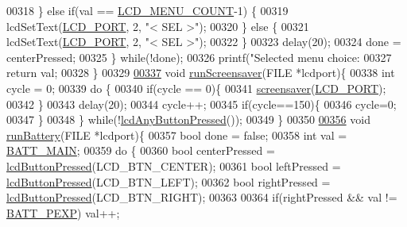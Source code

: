 \begin{DoxyCode}
00318         \} \textcolor{keywordflow}{else} \textcolor{keywordflow}{if}(val == \hyperlink{lcddiag_8h_af08e03edfc50fa6a3af2555f9cce6e6c}{LCD\_MENU\_COUNT}-1) \{
00319             lcdSetText(\hyperlink{lcdmsg_8h_abcf42bd88b3c36193f301ca25b033875}{LCD\_PORT}, 2, \textcolor{stringliteral}{"<      SEL     >"});
00320         \} \textcolor{keywordflow}{else} \{
00321             lcdSetText(\hyperlink{lcdmsg_8h_abcf42bd88b3c36193f301ca25b033875}{LCD\_PORT}, 2, \textcolor{stringliteral}{"<      SEL     >"});
00322         \}
00323         delay(20);
00324         done = centerPressed;
00325     \} \textcolor{keywordflow}{while}(!done);
00326     printf(\textcolor{stringliteral}{"Selected menu choice: %
00327     \textcolor{keywordflow}{return} val;
00328 \}
00329 
\hypertarget{lcddiag_8c_source.tex_l00337}{}\hyperlink{lcddiag_8c_a26920e40538bd7b86a0453f2629991d0}{00337} \textcolor{keywordtype}{void} \hyperlink{lcddiag_8c_a26920e40538bd7b86a0453f2629991d0}{runScreensaver}(FILE *lcdport)\{
00338     \textcolor{keywordtype}{int} cycle = 0;
00339     \textcolor{keywordflow}{do} \{
00340         \textcolor{keywordflow}{if}(cycle == 0)\{
00341             \hyperlink{lcdmsg_8c_acc19fe50b302412c894538965e77cb8b}{screensaver}(\hyperlink{lcdmsg_8h_abcf42bd88b3c36193f301ca25b033875}{LCD\_PORT});
00342         \}
00343         delay(20);
00344         cycle++;
00345         \textcolor{keywordflow}{if}(cycle==150)\{
00346             cycle=0;
00347         \}
00348     \} \textcolor{keywordflow}{while}(!\hyperlink{lcddiag_8h_a0592813f995bfeeadb9bee923833ed35}{lcdAnyButtonPressed}());
00349 \}
00350 
\hypertarget{lcddiag_8c_source.tex_l00356}{}\hyperlink{lcddiag_8c_a9a604d967527579e547780271290500f}{00356} \textcolor{keywordtype}{void} \hyperlink{lcddiag_8c_a9a604d967527579e547780271290500f}{runBattery}(FILE *lcdport)\{
00357     \textcolor{keywordtype}{bool} done = \textcolor{keyword}{false};
00358     \textcolor{keywordtype}{int} val = \hyperlink{sensors_8h_aa48831e4de90908c1b37560e7aba2c5f}{BATT\_MAIN};
00359     \textcolor{keywordflow}{do} \{
00360         \textcolor{keywordtype}{bool} centerPressed = \hyperlink{lcddiag_8h_a74e4c744db49f9b7b645095575e152ad}{lcdButtonPressed}(LCD\_BTN\_CENTER);
00361         \textcolor{keywordtype}{bool} leftPressed = \hyperlink{lcddiag_8h_a74e4c744db49f9b7b645095575e152ad}{lcdButtonPressed}(LCD\_BTN\_LEFT);
00362         \textcolor{keywordtype}{bool} rightPressed = \hyperlink{lcddiag_8h_a74e4c744db49f9b7b645095575e152ad}{lcdButtonPressed}(LCD\_BTN\_RIGHT);
00363 
00364         \textcolor{keywordflow}{if}(rightPressed && val != \hyperlink{sensors_8h_aaad063d8cfbd393cdc04bcaae68b48ef}{BATT\_PEXP}) val++;
}
\end{DoxyCode}
